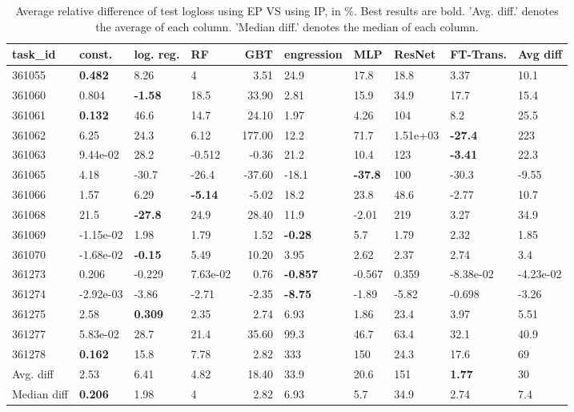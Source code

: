 \begin{table}[ht!]
\centering
\begingroup\footnotesize
\begin{tabular}{llllrlllll}
  \hline
\hline
task\_id & const. & log. reg. & RF & GBT & engression & MLP & ResNet & FT-Trans. & Avg diff \\ 
  \hline
361055 & \textbf{0.482} & 8.26 & 4 & 3.51 & 24.9 & 17.8 & 18.8 & 3.37 & 10.1 \\ 
  361060 & 0.804 & \textbf{-1.58} & 18.5 & 33.90 & 2.81 & 15.9 & 34.9 & 17.7 & 15.4 \\ 
  361061 & \textbf{0.132} & 46.6 & 14.7 & 24.10 & 1.97 & 4.26 & 104 & 8.2 & 25.5 \\ 
  361062 & 6.25 & 24.3 & 6.12 & 177.00 & 12.2 & 71.7 &  1.51e+03 & \textbf{-27.4} & 223 \\ 
  361063 &  9.44e-02 & 28.2 & -0.512 & -0.36 & 21.2 & 10.4 & 123 & \textbf{-3.41} & 22.3 \\ 
  361065 & 4.18 & -30.7 & -26.4 & -37.60 & -18.1 & \textbf{-37.8} & 100 & -30.3 & -9.55 \\ 
  361066 & 1.57 & 6.29 & \textbf{-5.14} & -5.02 & 18.2 & 23.8 & 48.6 & -2.77 & 10.7 \\ 
  361068 & 21.5 & \textbf{-27.8} & 24.9 & 28.40 & 11.9 & -2.01 & 219 & 3.27 & 34.9 \\ 
  361069 & -1.15e-02 & 1.98 & 1.79 & 1.52 & \textbf{-0.28} & 5.7 & 1.79 & 2.32 & 1.85 \\ 
  361070 & -1.68e-02 & \textbf{-0.15} & 5.49 & 10.20 & 3.95 & 2.62 & 2.37 & 2.74 & 3.4 \\ 
  361273 & 0.206 & -0.229 &  7.63e-02 & 0.76 & \textbf{-0.857} & -0.567 & 0.359 & -8.38e-02 & -4.23e-02 \\ 
  361274 & -2.92e-03 & -3.86 & -2.71 & -2.35 & \textbf{-8.75} & -1.89 & -5.82 & -0.698 & -3.26 \\ 
  361275 & 2.58 & \textbf{0.309} & 2.35 & 2.74 & 6.93 & 1.86 & 23.4 & 3.97 & 5.51 \\ 
  361277 &  5.83e-02 & 28.7 & 21.4 & 35.60 & 99.3 & 46.7 & 63.4 & 32.1 & 40.9 \\ 
  361278 & \textbf{0.162} & 15.8 & 7.78 & 2.82 & 333 & 150 & 24.3 & 17.6 & 69 \\ 
   \hline
Avg. diff & 2.53 & 6.41 & 4.82 & 18.40 & 33.9 & 20.6 & 151 & \textbf{1.77} & 30 \\ 
  Median diff & \textbf{0.206} & 1.98 & 4 & 2.82 & 6.93 & 5.7 & 34.9 & 2.74 & 7.4 \\ 
   \hline
\hline
\end{tabular}
\endgroup
\caption{Average relative difference of test logloss using EP VS using IP, in \%. 
                  Best results are bold. 
                  'Avg. diff.' denotes the average of each column.
                  'Median diff.' denotes the median of each column.} 
\label{TABLES/table_results_umap_logloss_only_num_features_EP_VS_IP}
\end{table}
